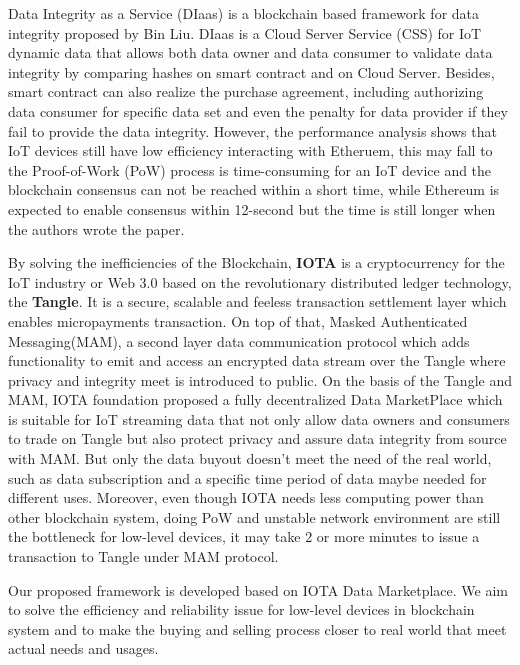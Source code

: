 \documentclass{svproc}
\begin{document}
Data Integrity as a Service (DIaas) is a blockchain based framework for data integrity proposed by Bin Liu\cite{DIaas}. DIaas is a Cloud Server Service (CSS) for IoT dynamic data that allows both data owner and data consumer to validate data integrity by comparing hashes on smart contract  and on Cloud Server. Besides, smart contract can also realize the purchase agreement, including authorizing data consumer for specific data set and even the penalty for data provider if they fail to provide the data integrity. However, the performance analysis shows that IoT devices still have low efficiency interacting with Etheruem, this may fall to the Proof-of-Work (PoW) process is time-consuming for an IoT device and the blockchain consensus can not be reached within a short time, while Ethereum is expected to enable consensus within 12-second but the time is still longer when the authors wrote the paper. 

By solving the inefficiencies of the Blockchain, \textbf{IOTA}\cite{IOTAwhitepaper} is a cryptocurrency for the IoT industry or Web 3.0 based on the revolutionary distributed ledger technology, the \textbf{Tangle}. It is a secure, scalable and feeless transaction settlement layer which enables micropayments transaction. On top of that, Masked Authenticated Messaging(MAM)\cite{MAM}, a second layer data communication protocol which adds functionality to emit and access an encrypted data stream over the Tangle where privacy and integrity meet is introduced to public. On the basis of the Tangle and MAM, IOTA foundation proposed a fully decentralized Data MarketPlace which is suitable for IoT streaming data that not only allow data owners and consumers to trade on Tangle but also protect privacy and assure data integrity from source with MAM. But only the data buyout doesn't meet the need of the real world, such as data subscription and a specific time period of data maybe needed for different uses. Moreover, even though IOTA needs less computing power than other blockchain system, doing PoW and unstable network environment are still the bottleneck for low-level devices, it may take 2 or more minutes to issue a transaction to Tangle under MAM protocol.

Our proposed framework is developed based on IOTA Data Marketplace. We aim to solve the efficiency and reliability issue for low-level devices in blockchain system and to make the buying and selling process closer to real world that meet actual needs and usages.
\end{document}

